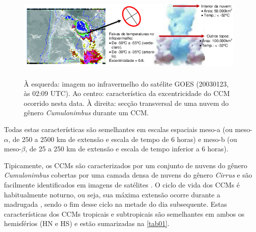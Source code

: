 \begin{figure}[!hpb]
\centering
\includegraphics[height=4.5cm]{./figs/fig08.png}
\caption{À esquerda: imagem no infravermelho do satélite GOES (20030123, às 02:09 UTC). Ao centro: característica da excentricidade do CCM ocorrido nesta data. À direita: secção transversal de uma nuvem do gênero \textit{Cumulonimbus} durante um CCM.}
\label{fig03}
\end{figure}

Todas estas características são semelhantes em escalas espaciais meso-a (ou meso-$\alpha$, de 250 a 2500 km de extensão e escala de tempo de 6 horas) e meso-b (ou meso-$\beta$, de 25 a 250 km de extensão e escala de tempo inferior a 6 horas).

Tipicamente, os CCMs são caracterizados por um conjunto de nuvens do gênero \textit{Cumulonimbus} cobertas por uma camada densa de nuvens do gênero \textit{Cirrus} e são facilmente identificados em imagens de satélites \cite{silvadias87}. O ciclo de vida dos CCMs é habitualmente noturno, ou seja, sua máxima extensão ocorre durante a madrugada \cite{velascofritsch87}, sendo o fim desse ciclo na metade do dia subsequente. Estas características dos CCMs tropicais e subtropicais são semelhantes em ambos os hemisférios (HN e HS) e estão sumarizadas na \autoref{tab01}.

